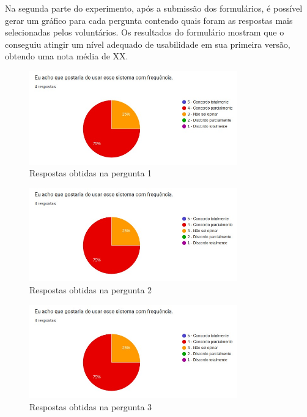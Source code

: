 \documentclass[12pt]{tcc}
\begin{document}
Na segunda parte do experimento, após a submissão dos formulários, é possível gerar um gráfico para cada pergunta contendo quais foram as respostas mais selecionadas pelos voluntários. Os resultados do formulário mostram que o  conseguiu atingir um nível adequado de usabilidade em sua primeira versão, obtendo uma nota média de XX.

\begin{figure}[!ht]
	\centering
	\includegraphics[width=0.8\textwidth]{figures/respostas-pergunta-1.jpeg}
	\caption{Respostas obtidas na pergunta 1}
	\label{fig:respostas-pergunta-1}
\end{figure}

\pagebreak

\begin{figure}[!ht]
	\centering
	\includegraphics[width=0.8\textwidth]{figures/respostas-pergunta-2.jpeg}
	\caption{Respostas obtidas na pergunta 2}
	\label{fig:respostas-pergunta-2}
\end{figure}

\begin{figure}[!ht]
	\centering
	\includegraphics[width=0.8\textwidth]{figures/respostas-pergunta-3.jpeg}
	\caption{Respostas obtidas na pergunta 3}
	\label{fig:respostas-pergunta-3}
\end{figure}
\end{document}
